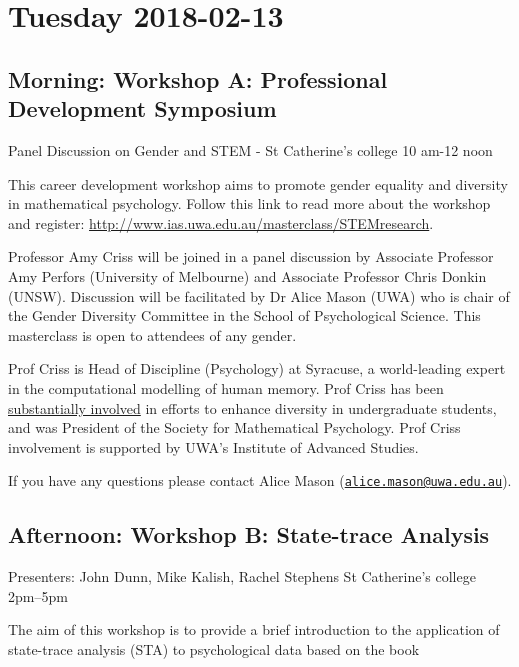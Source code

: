 \documentclass[]{article}
\begin{document}
\pagebreak

\section{Tuesday 2018-02-13}\label{tuesday-2018-02-13}

\subsection{Morning: Workshop A: Professional Development
Symposium}\label{morning-workshop-a-professional-development-symposium}

Panel Discussion on Gender and STEM - St Catherine's college 10 am-12
noon

This career development workshop aims to promote gender equality and
diversity in mathematical psychology. Follow this link to read more
about the workshop and register:
\url{http://www.ias.uwa.edu.au/masterclass/STEMresearch}.

Professor Amy Criss will be joined in a panel discussion by Associate
Professor Amy Perfors (University of Melbourne) and Associate Professor
Chris Donkin (UNSW). Discussion will be facilitated by Dr Alice Mason
(UWA) who is chair of the Gender Diversity Committee in the School of
Psychological Science. This masterclass is open to attendees of any
gender.

Prof Criss is Head of Discipline (Psychology) at Syracuse, a
world-leading expert in the computational modelling of human memory.
Prof Criss has been
\href{http://memolab.syr.edu/Pride.html}{substantially involved} in
efforts to enhance diversity in undergraduate students, and was
President of the Society for Mathematical Psychology. Prof Criss
involvement is supported by UWA's Institute of Advanced Studies.

If you have any questions please contact Alice Mason
(\href{mailto:alice.mason@uwa.edu.au}{\nolinkurl{alice.mason@uwa.edu.au}}).

\subsection{Afternoon: Workshop B: State-trace
Analysis}\label{afternoon-workshop-b-state-trace-analysis}

Presenters: John Dunn, Mike Kalish, Rachel Stephens St Catherine's
college 2pm--5pm

The aim of this workshop is to provide a brief introduction to the
application of state-trace analysis (STA) to psychological data based on
the book
\end{document}
